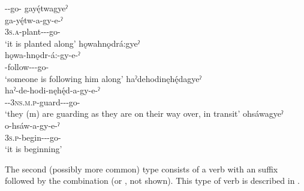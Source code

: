 \ea\label{ex:dislprogex2}  {\joinerA}-{\progressive}-go-{\stative}
\ea gayę́twagyeˀ\\
\gll ga-yę́tw-a-gy-e-ˀ\\
 \textsc{3s.a}-plant-{\joinerA}-{\progressive}-go-{\stative}\\
\glt `it is planted along'
\ex hǫwahnǫdrá:gyeˀ\\
\gll hǫwa-hnǫdr-á:-gy-e-ˀ\\
 -follow-{\joinerA}-{\progressive}-go-{\stative}\\
\glt `someone is following him along'
\ex haˀdehodinęhę́dagyeˀ\\
\gll haˀ-de-hodi-nęhę́d-a-gy-e-ˀ\\
 {\translocative}-{\dualic}-\textsc{3ns.m.p}-guard-{\joinerA}-{\progressive}-go-{\stative}\\
\glt `they (m) are guarding as they are on their way over, in transit'
\ex ohsáwagyeˀ\\
\gll o-hsáw-a-gy-e-ˀ\\
 \textsc{3s.p}-begin-{\joinerA}-{\progressive}-go-{\stative}\\
\glt `it is beginning'
\z
\z

The second (possibly more common) type consists of a verb with an  {\stative} suffix followed by the  combination  (or , not shown). This type of verb is described in .


